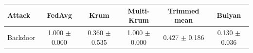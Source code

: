 \begin{tabular}{lccccc}
\toprule
Attack & FedAvg & Krum & Multi-Krum & Trimmed mean & Bulyan \\
\midrule
Backdoor & 1.000 $\pm$ 0.000 & 0.360 $\pm$ 0.535 & 1.000 $\pm$ 0.000 & 0.427 $\pm$ 0.186 & 0.130 $\pm$ 0.036 \\
\bottomrule
\end{tabular}
